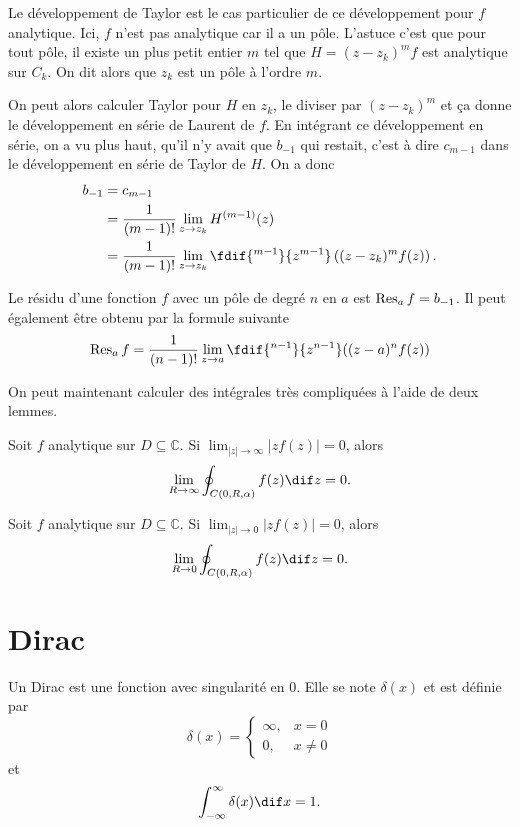 Le développement de Taylor est le cas particulier de ce développement
pour $f$ analytique.
Ici, $f$ n'est pas analytique car il a un pôle.
L'astuce c'est que pour tout pôle, il existe un plus petit entier
$m$ tel que $H = (z-z_k)^mf$ est analytique sur $C_k$.
On dit alors que $z_k$ est un pôle à l'ordre $m$.

On peut alors calculer Taylor pour $H$ en $z_k$,
le diviser par $(z-z_k)^m$ et ça donne le développement en série de Laurent
de $f$.
En intégrant ce développement en série, on a vu plus haut,
qu'il n'y avait que $b_{-1}$ qui restait,
c'est à dire $c_{m-1}$ dans le développement en série de Taylor de
$H$.
On a donc
\begin{align*}
  b_{-1} & = c_{m-1}\\
  & = \frac{1}{(m-1)!}\lim_{z\to z_k} H^{(m-1)}(z)\\
  & = \frac{1}{(m-1)!}\lim_{z\to z_k} \fdif{^{m-1}}{z^{m-1}}
  \left((z-z_k)^m f(z)\right).
\end{align*}

\begin{mydef}
  Le résidu d'une fonction $f$ avec un pôle de degré $n$ en $a$ est
  $\operatorname{Res}_a f = b_{-1}$.
  Il peut également être obtenu par la formule suivante
  \[ \res_a f = \frac{1}{(n-1)!} \lim_{z \to a}
  \fdif{^{n-1}}{z^{n-1}}((z-a)^nf(z)) \]
\end{mydef}

On peut maintenant calculer des intégrales très compliquées à l'aide de
deux lemmes.
\begin{mylem}
  Soit $f$ analytique sur $D \subseteq \mathbb{C}$.
  Si $\lim_{|z|\to\infty} |zf(z)| = 0$, alors
  \[ \lim_{R\to\infty} \oint_{C(0,R,\alpha)}f(z)\dif z = 0. \]
\end{mylem}
\begin{mylem}
  Soit $f$ analytique sur $D \subseteq \mathbb{C}$.
  Si $\lim_{|z|\to 0} |zf(z)| = 0$, alors
  \[ \lim_{R\to 0} \oint_{C(0,R,\alpha)}f(z)\dif z = 0. \]
\end{mylem}

\annexe
\section{Dirac}
\label{app:dirac}
Un Dirac est une fonction avec singularité en 0.
Elle se note $\delta(x)$ et est définie par
\begin{equation}
  \label{eq:dirac1}
  \delta(x) =
  \begin{cases}
    \infty, & x = 0\\
    0, & x \neq 0
  \end{cases}
\end{equation}
et
\begin{equation}
  \label{eq:dirac2}
  \int_{-\infty}^{\infty} \delta(x) \dif x = 1.
\end{equation}

